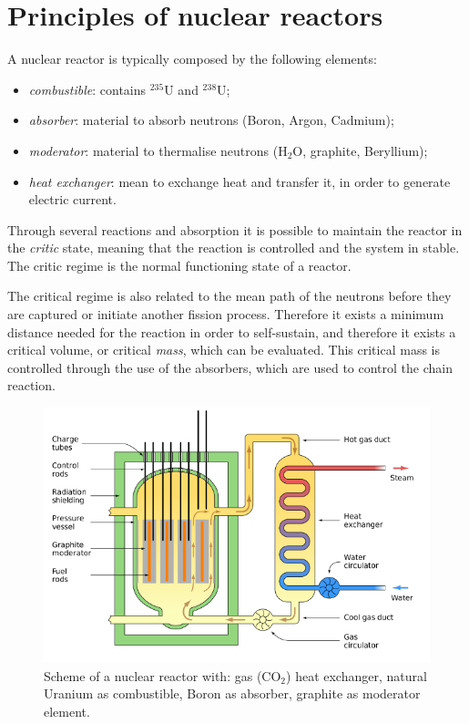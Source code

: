 \section{Principles of nuclear reactors}
A nuclear reactor is typically composed by the following elements:
\begin{itemize}
    \item \emph{combustible}: contains $^{235}\mbox{U}$ and $^{238}\mbox{U}$;
    \item \emph{absorber}: material to absorb neutrons (Boron, Argon, Cadmium);
    \item \emph{moderator}: material to thermalise neutrons (H$_2$O, graphite, Beryllium);
    \item \emph{heat exchanger}: mean to exchange heat and transfer it, in order to generate electric current.
\end{itemize}
Through several reactions and absorption it is possible to maintain the reactor in the \emph{critic} state, meaning that the reaction is controlled and the system in stable. The critic regime is the normal functioning state of a reactor. 

The critical regime is also related to the mean path of the neutrons before they are captured or initiate another fission process. Therefore it exists a minimum distance needed for the reaction in order to self-sustain, and therefore it exists a critical volume, or critical \emph{mass}, which can be evaluated. This critical mass is controlled through the use of the absorbers, which are used to control the chain reaction.

\begin{figure}
    \centering
    \includegraphics{Figures/nuclear-physics3-fig9.pdf}
    \caption{Scheme of a nuclear reactor with: gas (CO$_2$) heat exchanger, natural Uranium as combustible, Boron as absorber, graphite as moderator element.}
    \label{fig:my_label}
\end{figure}

